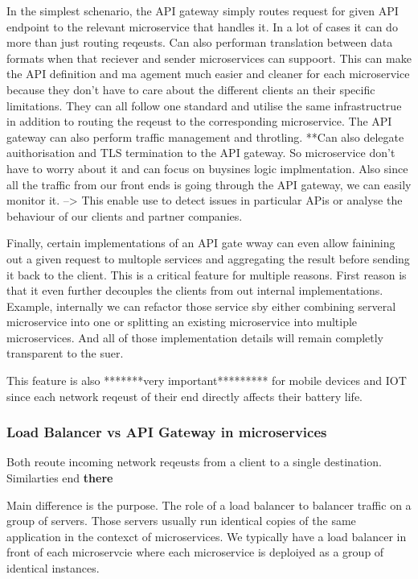 \documentclass[a4paper, 11pt]{book}
\begin{document}
{    In the simplest schenario, the API gateway simply routes request for given API endpoint to the relevant microservice that handles it.
    In a lot of cases it can do more than just routing reqeusts.
    Can also performan translation between data formats when that reciever and sender microservices can suppoort.
    This can make the API definition and ma agement much easier and cleaner for each microservice because they don't have to care about the different clients an their specific limitations.
    They can all follow one standard and utilise the same infrastructrue in addition to routing the reqeust to the corresponding microservice.
    The API gateway can also perform traffic management and throtling.
    **Can also delegate auithorisation and TLS termination to the API gateway.
    So microservice don't have to worry about it and can focus on buysines logic implmentation.
    Also since all the traffic from our front ends is going through the API gateway, we can easily monitor it.
    --> This enable use to detect issues in particular APis or analyse the behaviour of our clients and partner companies.

    Finally, certain implementations of an API gate wway can even allow fainining out a given request to multople services and aggregating the result before sending it back to the client.
    This is a critical feature for multiple reasons.
    First reason is that it even further decouples the clients from out internal implementations.
    Example, internally we can refactor those service sby either combining serveral microservice into one or splitting an existing microservice into multiple microservices.
    And all of those implementation details will remain completly transparent to the suer.

    This feature is also *******very important********* for mobile devices and IOT since each network reqeust of their end directly affects their battery life.

    \subsubsection{Load Balancer vs API Gateway in microservices}
    Both reoute incoming network reqeusts from a client to a single destination.
    Similarties end \textbf{there}

    Main difference is the purpose.
    The role of a load balancer to balancer traffic on a group of servers.
    Those servers usually run identical copies of the same application in the contexct of microservices.
    We typically have a load balancer in front of each microservcie where each microservice is deploiyed as a group of identical instances.

}
\end{document}
